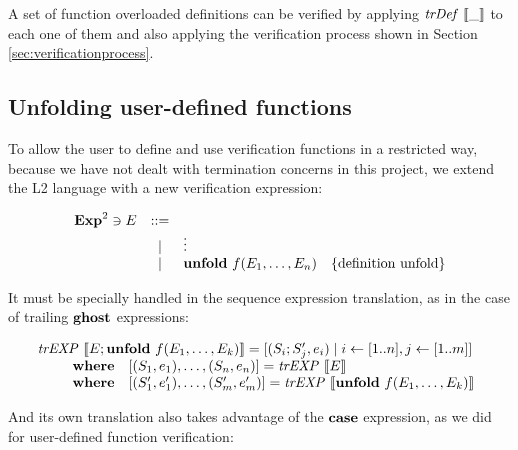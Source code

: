 A set of function overloaded definitions can be verified by applying
$\mathit{trDef}~\llbracket\_\rrbracket$ to each one of them and also applying the verification process
shown in Section \ref{sec:verificationprocess}.

\subsection{Unfolding user-defined functions}

To allow the user to define and use verification functions in a restricted way,
because we have not dealt with termination concerns in this project, we extend 
the L2 language with a new verification expression:

\[
\begin{array}{rcll}
\mathbf{Exp}^{2} \ni E & ::= & & \\
& | & \vdots \\
& | & \textbf{unfold}~f(E_1,\dots,E_n) & \{ \textrm{definition unfold} \} \\
\end{array}
\]

It must be specially handled in the sequence expression translation, as 
in the case of trailing $\textbf{ghost}$ expressions:

\[
\begin{array}{l}
\mathit{trEXP}~\llbracket E;\textbf{unfold}~f(E_1,\dots,E_k)\rrbracket  = [(S_i;S'_j,e_i) \mid i \leftarrow [1..n], j \leftarrow [1..m]] \\
\qquad 
\begin{array}{ll}
\textbf{where} & [(S_1,e_1),\dots,(S_n, e_n)] = \mathit{trEXP}~\llbracket E\rrbracket \\
\textbf{where} & [(S'_1,e'_1),\dots,(S'_m, e'_m)] = \mathit{trEXP}~\llbracket\textbf{unfold}~f(E_1,\dots,E_k)\rrbracket \\
\end{array}
\end{array}
\]

And its own translation also takes advantage of the $\textbf{case}$ expression, as we did
for user-defined function verification:

